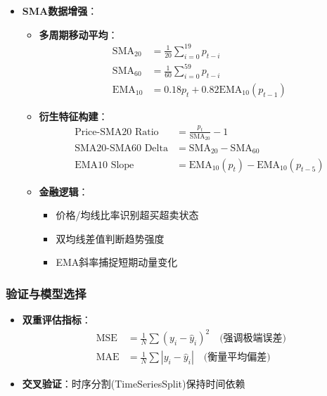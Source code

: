 \documentclass[a4paper,11pt]{ctexart}
\begin{document}
\begin{itemize}
  
  \item \textbf{SMA数据增强}：
    \begin{itemize}
    \item \textbf{多周期移动平均}：
      \begin{align*}
      \text{SMA}_{20} &= \frac{1}{20}\sum_{i=0}^{19} p_{t-i} \\
      \text{SMA}_{60} &= \frac{1}{60}\sum_{i=0}^{59} p_{t-i} \\
      \text{EMA}_{10} &= 0.18p_t + 0.82\text{EMA}_{10}(p_{t-1})
      \end{align*}
      
    \item \textbf{衍生特征构建}：
      \begin{equation*}
      \begin{aligned}
      \text{Price-SMA20 Ratio} &= \frac{p_t}{\text{SMA}_{20}} - 1 \\
      \text{SMA20-SMA60 Delta} &= \text{SMA}_{20} - \text{SMA}_{60} \\
      \text{EMA10 Slope} &= \text{EMA}_{10}(p_t) - \text{EMA}_{10}(p_{t-5})
      \end{aligned}
      \end{equation*}
      
    \item \textbf{金融逻辑}：
      \begin{itemize}
      \item 价格/均线比率识别超买超卖状态
      \item 双均线差值判断趋势强度
      \item EMA斜率捕捉短期动量变化
      \end{itemize}
    \end{itemize}
  \end{itemize}
  
\subsubsection{验证与模型选择}
\begin{itemize}
\item \textbf{双重评估指标}：
  \begin{align*}
  \text{MSE} &= \frac{1}{N}\sum(y_i-\hat{y}_i)^2 \quad \text{(强调极端误差)} \\
  \text{MAE} &= \frac{1}{N}\sum|y_i-\hat{y}_i| \quad \text{(衡量平均偏差)}
  \end{align*}
  

\item \textbf{交叉验证}：时序分割(TimeSeriesSplit)保持时间依赖
\end{itemize}
\end{document}
